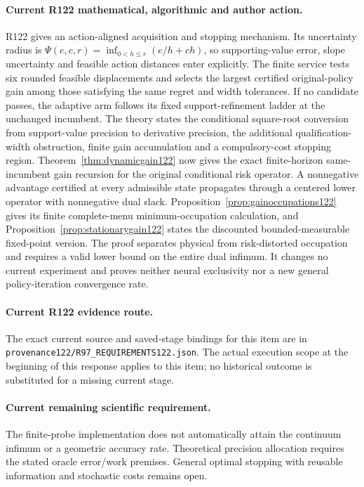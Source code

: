 \paragraph{Current R122 mathematical, algorithmic and author action.}
R122 gives an action-aligned acquisition and stopping mechanism. Its uncertainty radius is $\Psi(e,c,r)=\inf_{0<h\le r}(e/h+ch)$, so supporting-value error, slope uncertainty and feasible action distances enter explicitly. The finite service tests six rounded feasible displacements and selects the largest certified original-policy gain among those satisfying the same regret and width tolerances. If no candidate passes, the adaptive arm follows its fixed support-refinement ladder at the unchanged incumbent. The theory states the conditional square-root conversion from support-value precision to derivative precision, the additional qualification-width obstruction, finite gain accumulation and a compulsory-cost stopping region. Theorem~\ref{thm:dynamicgain122} now gives the exact finite-horizon same-incumbent gain recursion for the original conditional risk operator. A nonnegative advantage certified at every admissible state propagates through a centered lower operator with nonnegative dual slack. Proposition~\ref{prop:gainoccupations122} gives its finite complete-menu minimum-occupation calculation, and Proposition~\ref{prop:stationarygain122} states the discounted bounded-measurable fixed-point version. The proof separates physical from risk-distorted occupation and requires a valid lower bound on the entire dual infimum. It changes no current experiment and proves neither neural exclusivity nor a new general policy-iteration convergence rate.
\paragraph{Current R122 evidence route.}
The exact current source and saved-stage bindings for this item are in \nolinkurl{provenance122/R97_REQUIREMENTS122.json}. The actual execution scope at the beginning of this response applies to this item; no historical outcome is substituted for a missing current stage.
\paragraph{Current remaining scientific requirement.}
The finite-probe implementation does not automatically attain the continuum infimum or a geometric accuracy rate. Theoretical precision allocation requires the stated oracle error/work premises. General optimal stopping with reusable information and stochastic costs remains open.

